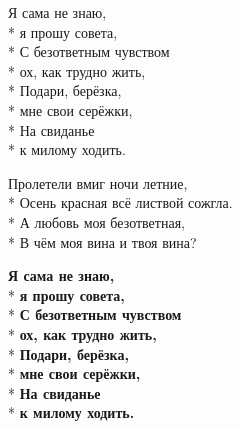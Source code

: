 \begin{minipage}{\linewidth}
\hspace*{1.5em}Я сама не знаю,\\*
\hspace*{1.5em}я прошу совета,\\*
\hspace*{1.5em}С безответным чувством\\*
\hspace*{1.5em}ох, как трудно жить,\\*
\hspace*{1.5em}Подари, берёзка,\\*
\hspace*{1.5em}мне свои серёжки,\\*
\hspace*{1.5em}На свиданье\\*
\hspace*{1.5em}к милому ходить.\\
\end{minipage}\par\medskip\nobreak

\medskip

\begin{minipage}{\linewidth}
Пролетели вмиг ночи летние,\\*
Осень красная всё листвой сожгла.\\*
А любовь моя безответная,\\*
В чём моя вина и твоя вина?\\
\end{minipage}\par\medskip\nobreak

\medskip

\begin{minipage}{\linewidth}
\hspace*{1.5em}\textbf{Я сама не знаю,}\\*
\hspace*{1.5em}\textbf{я прошу совета,}\\*
\hspace*{1.5em}\textbf{С безответным чувством}\\*
\hspace*{1.5em}\textbf{ох, как трудно жить,}\\*
\hspace*{1.5em}\textbf{Подари, берёзка,}\\*
\hspace*{1.5em}\textbf{мне свои серёжки,}\\*
\hspace*{1.5em}\textbf{На свиданье}\\*
\hspace*{1.5em}\textbf{к милому ходить.}\\
\end{minipage}

